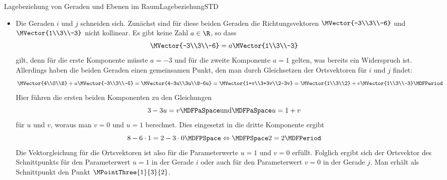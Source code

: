 \begin{MXContent}{Lagebeziehung von Geraden und Ebenen im Raum}{Lagebeziehung}{STD}
\begin{MExample}
\begin{itemize}
\item Die Geraden $i$ und $j$ schneiden sich. Zunächst sind für diese beiden Geraden die Richtungsvektoren $\MVector{-3\\3\\-6}$ und $\MVector{1\\3\\-3}$ nicht kollinear. Es gibt keine Zahl $a\in\R$, so dass
\[
 \MVector{-3\\3\\-6}=a\MVector{1\\3\\-3}
\]
gilt, denn für die erste Komponente müsste $a=-3$ und für die zweite Komponente $a=1$ gelten, was bereits ein Widerspruch ist. Allerdings haben die beiden Geraden einen gemeinsamen Punkt, den man durch Gleichsetzen der Ortsvektoren für $i$ und $j$ findet:
\[
 \MVector{4\\0\\8}+u\MVector{-3\\3\\-6}=\MVector{4-3u\\3u\\8-6u}=\MVector{1+v\\3+3v\\2-3v}=\MVector{1\\3\\2}+v\MVector{1\\3\\-3}\MDFPeriod
\]
Hier führen die ersten beiden Komponenten zu den Gleichungen
\[
 3-3u=v\MDFPaSpace\textrm{und}\MDFPaSpace u=1+v
\]
für $u$ und $v$, woraus man $v=0$ und $u=1$ berechnet. Dies eingesetzt in die dritte Komponente ergibt
\[
 8-6\cdot 1=2-3\cdot 0\MDFPSpace\Leftrightarrow\MDFPSpace 2=2 \MDFPeriod
\]
Die Vektorgleichung für die Ortsvektoren ist also für die Parameterwerte $u=1$ und $v=0$ erfüllt. Folglich ergibt sich der Ortsvektor des Schnittpunkts für den Parameterwert $u=1$ in der Gerade $i$ oder auch für den Parameterwert $v=0$ in der Gerade $j$. Man erhält als  Schnittpunkt den Punkt $\MPointThree{1}{3}{2}$.


\end{itemize}
\end{MExample}
\end{MXContent}
